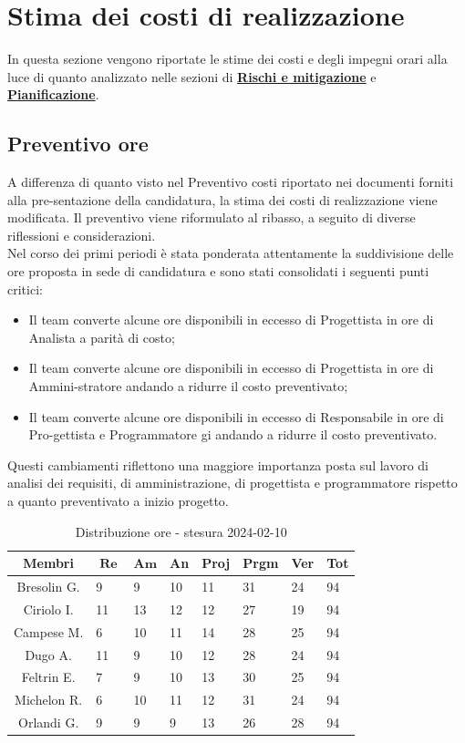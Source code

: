 \documentclass[10pt, a4paper]{article}
\begin{document}
\section{Stima dei costi di realizzazione}
In questa sezione vengono riportate le stime dei costi e degli impegni orari alla luce di quanto analizzato nelle sezioni di \hyperref[section:Rischi]{\textbf{Rischi e mitigazione}} e \hyperref[section:Pianificazione]{\textbf{Pianificazione}}.

\subsection{Preventivo ore}
A differenza di quanto visto nel Preventivo costi riportato nei documenti forniti alla pre-sentazione della candidatura, la stima dei costi di realizzazione viene modificata. Il preventivo viene riformulato al ribasso, a seguito di diverse riflessioni e considerazioni.\\
Nel corso dei primi periodi è stata ponderata attentamente la suddivisione delle ore proposta in sede di candidatura e sono stati consolidati i seguenti punti critici:
\begin{itemize}
    \item Il team converte alcune ore disponibili in eccesso di Progettista in ore di Analista a parità di costo;
    \item Il team converte alcune ore disponibili in eccesso di Progettista in ore di Ammini-stratore andando a ridurre il costo preventivato;
    \item Il team converte alcune ore disponibili in eccesso di Responsabile in ore di Pro-gettista e Programmatore gi andando a ridurre il costo preventivato.
\end{itemize}
Questi cambiamenti riflettono una maggiore importanza posta sul lavoro di analisi dei requisiti, di amministrazione, di progettista e programmatore rispetto a quanto preventivato a inizio progetto.

\renewcommand{\arraystretch}{1.2}
\begin{table}[H]
\begin{tabularx}{\textwidth}{c|X|X|X|X|X|X|X}
        \textbf{Membri} & $\operatorname{\textbf{Re}}$ & $\mathrm{\textbf{Am}}$ & \textbf{An} & \textbf{Proj} & \textbf{Prgm} & \textbf{Ver} & \textbf{Tot} \\
        \hline Bresolin G. & 9 & 9 & 10 & 11 & 31 & 24 & 94 \\
        \hline Ciriolo I. & 11 & 13 & 12 & 12 & 27 & 19 & 94 \\
        \hline Campese M. & 6 & 10 & 11 & 14 & 28 & 25 & 94 \\
        \hline Dugo A.   & 11 & 9 & 10 & 12 & 28 & 24 & 94 \\
        \hline Feltrin E. & 7 & 9 & 10 & 13 & 30 & 25 & 94 \\
        \hline Michelon R. & 6 & 10 & 11 & 12 & 31 & 24 & 94 \\
        \hline Orlandi G. & 9 & 9 & 9 & 13 & 26 & 28 & 94 
    \end{tabularx}
    \caption{Distribuzione ore - stesura 2024-02-10}
    \end{table}
\end{document}

